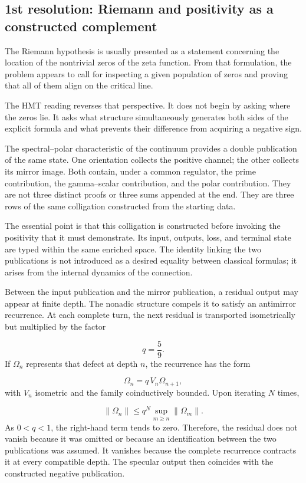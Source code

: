 \subsection{1st resolution: Riemann and positivity as a constructed complement}
The Riemann hypothesis is usually presented as a statement concerning the location of the nontrivial zeros of the zeta function. From that formulation, the problem appears to call for inspecting a given population of zeros and proving that all of them align on the critical line.\par
The HMT reading reverses that perspective. It does not begin by asking
where the zeros lie. It asks what structure simultaneously generates both
sides of the explicit formula and what prevents their difference from
acquiring a negative sign.\par
The spectral–polar characteristic of the continuum provides a double publication of the same state. One orientation collects the positive channel; the other collects its mirror image. Both contain, under a common regulator, the prime contribution, the gamma–scalar contribution, and the polar contribution. They are not three distinct proofs or three sums appended at the end. They are three rows of the same colligation constructed from the starting data.\par
The essential point is that this colligation is constructed before invoking the positivity that it must demonstrate. Its input, outputs, loss, and terminal state are typed within the same enriched space. The identity linking the two publications is not introduced as a desired equality between classical formulas; it arises from the internal dynamics of the connection.\par
Between the input publication and the mirror publication, a residual output
may appear at finite depth. The nonadic structure compels it to satisfy an
antimirror recurrence. At each complete turn, the next residual is
transported isometrically but multiplied by the factor\par
\[
q=\frac{5}{9}.
\]
If \(\Omega_n\) represents that defect at depth \(n\), the recurrence has the form\par
\[
\Omega_n=q\,V_n\Omega_{n+1},
\]
with \(V_n\) isometric and the family coinductively bounded. Upon iterating \(N\) times,\par
\[
\|\Omega_n\|
\le q^N\sup_{m\ge n}\|\Omega_m\|.
\]
As \(0<q<1\), the right-hand term tends to zero. Therefore, the residual does not vanish because it was omitted or because an identification between the two publications was assumed. It vanishes because the complete recurrence contracts it at every compatible depth. The specular output then coincides with the constructed negative publication.\par
